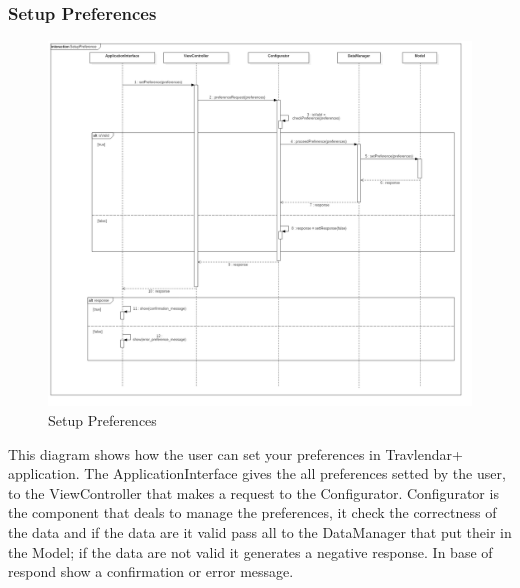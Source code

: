 \subsubsection{Setup Preferences}
\begin{figure}[!h]
\centering
\includegraphics[scale=0.25]{images/SetupPreference}
\caption{Setup Preferences}
\end{figure}
\par\bigskip 
\noindent
This diagram shows how the user can set your preferences in Travlendar+ application. The ApplicationInterface gives the all preferences setted by the user, to the ViewController that makes a request to the Configurator. Configurator is the component that deals to manage the preferences, it check the correctness of the data and if the data are it valid pass all to the DataManager that put their in the Model; if the data are not valid it generates a negative response. In base of respond show a confirmation or error message.

